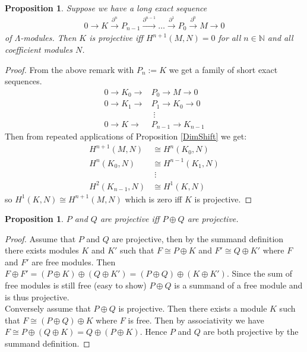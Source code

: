 \documentclass[12pt]{book}
\newtheorem{proposition}[theorem]{Proposition}
\theoremstyle{definition}
\begin{document}
\begin{proposition}
    Suppose we have a long exact sequence
    \begin{align*}
        0 \rightarrow K \xrightarrow{\partial^{n}} P_{n-1} \xrightarrow{\partial^{n-1}} \dots \xrightarrow{\partial^1} P_0 \xrightarrow{\partial^0} M \rightarrow 0
    \end{align*}
    of $\Lambda$-modules. Then $K$ is projective iff $H^{n+1}(M,N) = 0$ for all $n \in \mathbb{N}$ and all coefficient modules $N$. 
\end{proposition}
\begin{proof}
    From the above remark with $P_n := K$ we get a family of short exact sequences. 
    \begin{align*}
        0 \rightarrow K_0 \rightarrow &P_0 \rightarrow M \rightarrow 0 \\
        0 \rightarrow K_1 \rightarrow &P_1 \rightarrow K_0 \rightarrow 0 \\
        &\; \vdots\\
        0 \rightarrow K \rightarrow &P_{n-1} \rightarrow K_{n-1}
    \end{align*}
    Then from repeated applications of Proposition \ref{DimShift} we get: 
    \begin{align*}
        H^{n+1}(M,N) &\cong H^n(K_0,N)\\
        H^n(K_0, N)  &\cong H^{n-1}(K_1, N)\\
                     &\; \vdots\\
        H^2(K_{n-1}, N) & \cong H^1(K,N) 
    \end{align*}
    so $H^1(K,N) \cong H^{n+1}(M,N)$ which is zero iff $K$ is projective. 
\end{proof}   


\begin{proposition}
    $P$ and $Q$ are projective iff $P \oplus Q$ are projective. 
\end{proposition}
\begin{proof}
    Assume that $P$ and $Q$ are projective, then by the summand definition there exists modules $K$ and $K'$ such that $F \cong P \oplus K$ and $F' \cong Q \oplus K'$ where $F$ and $F'$ are free modules. Then $F \oplus F' = (P \oplus K) \oplus (Q \oplus K') = (P \oplus Q) \oplus (K \oplus K')$. Since the sum of free modules is still free (easy to show) $P \oplus Q$ is a summand of a free module and is thus projective. \\
    Conversely assume that $P \oplus Q$ is projective. Then there exists a module $K$ such that $F \cong (P \oplus Q) \oplus K$ where $F$ is free. Then by associativity we have $F \cong P \oplus (Q \oplus K)  = Q \oplus (P \oplus K)$. Hence $P$ and $Q$ are both projective by the summand definition.  
\end{proof}
\end{document}
